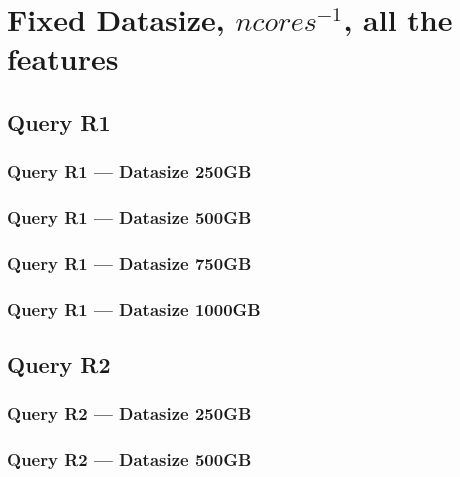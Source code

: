 \newpage
\section{Fixed Datasize, $ncores^{-1}$, all the features}
\subsection{Query R1}
\subsubsection{Query R1 --- Datasize 250GB}



\newpage
\subsubsection{Query R1 --- Datasize 500GB}



\newpage
\subsubsection{Query R1 --- Datasize 750GB}



\newpage
\subsubsection{Query R1 --- Datasize 1000GB}



\newpage
\subsection{Query R2}
\subsubsection{Query R2 --- Datasize 250GB}



\newpage
\subsubsection{Query R2 --- Datasize 500GB}



